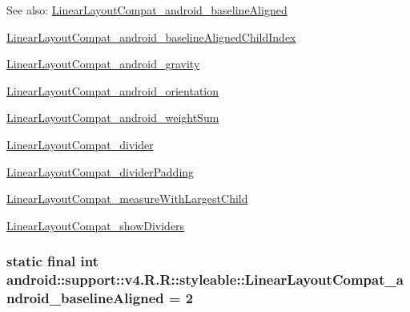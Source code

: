 \begin{Desc}
\item[See also:]\hyperlink{classandroid_1_1support_1_1v4_1_1_r_1_1styleable_8ff8a96f123f37d28206811c345732e4}{LinearLayoutCompat\_\-android\_\-baselineAligned} 

\hyperlink{classandroid_1_1support_1_1v4_1_1_r_1_1styleable_03736db57a910e8d6ce3bc7dc999fcfe}{LinearLayoutCompat\_\-android\_\-baselineAlignedChildIndex} 

\hyperlink{classandroid_1_1support_1_1v4_1_1_r_1_1styleable_1eb5d592245dd2ab2fe144f2aea87553}{LinearLayoutCompat\_\-android\_\-gravity} 

\hyperlink{classandroid_1_1support_1_1v4_1_1_r_1_1styleable_2fab5c4e37d706c344112f0c3adfdeda}{LinearLayoutCompat\_\-android\_\-orientation} 

\hyperlink{classandroid_1_1support_1_1v4_1_1_r_1_1styleable_8f749702d3ee9fc29c39a04661dd9b91}{LinearLayoutCompat\_\-android\_\-weightSum} 

\hyperlink{classandroid_1_1support_1_1v4_1_1_r_1_1styleable_678fcd55c5a19e3fde49a5ec33331fd9}{LinearLayoutCompat\_\-divider} 

\hyperlink{classandroid_1_1support_1_1v4_1_1_r_1_1styleable_00ee5a3b1918e743d8959a4de0289516}{LinearLayoutCompat\_\-dividerPadding} 

\hyperlink{classandroid_1_1support_1_1v4_1_1_r_1_1styleable_8b8d65edcdf29ccafcc0df613960971f}{LinearLayoutCompat\_\-measureWithLargestChild} 

\hyperlink{classandroid_1_1support_1_1v4_1_1_r_1_1styleable_fe02967a715f53721d56bd6750def3f6}{LinearLayoutCompat\_\-showDividers} \end{Desc}
\hypertarget{classandroid_1_1support_1_1v4_1_1_r_1_1styleable_8ff8a96f123f37d28206811c345732e4}{
\subsubsection[{LinearLayoutCompat\_\-android\_\-baselineAligned}]{\setlength{\rightskip}{0pt plus 5cm}static final int android::support::v4.R.R::styleable::LinearLayoutCompat\_\-android\_\-baselineAligned = 2}}
\label{classandroid_1_1support_1_1v4_1_1_r_1_1styleable_8ff8a96f123f37d28206811c345732e4}


